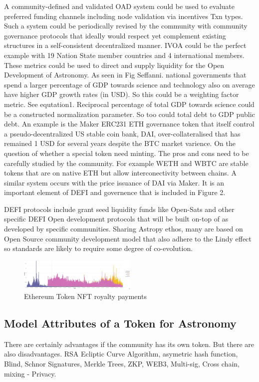 \documentclass[final,5p,times,twocolumn,authoryear]{elsarticle}
\begin{document}
A community-defined and validated OAD system could be used to evaluate preferred funding channels including node validation via incentives Txn types. Such a system could be periodically revised by the community with community governance protocols that ideally would respect yet complement existing structures in a self-consistent decentralized manner. IVOA could be the perfect example with 19 Nation State member countries and 4 international members. These metrics could be used to direct and supply liquidity for the Open Development of Astronomy. As seen in Fig Seffanni. national governments that spend a larger percentage of GDP towards science and technology also on average have higher GDP growth rates (in USD). So this could be a weighting factor metric. See equtation1. Reciprocal percentage of total GDP towards science could be a constructed normalization parameter. So too could total debt to GDP public debt.  An example is the Maker ERC231 ETH governance token that itself control a  pseudo-decentralized US stable coin bank, DAI, over-collateralised that has remained 1 USD for several years despite the BTC market varience.  On the question of whether a special token need minting. The pros and cons need to be carefully studied by the community. For example WETH and WBTC are stable tokens that are on native ETH but allow interconectivity between chains. A similar system occurs with the price issuance of DAI via Maker. It is an important element of DEFI and governence that is included in Figure 2.   

DEFI protocols include grant seed liquidity funds like Open-Sats and other specific DEFI Open development protocols that will be built on-top of as developed by specific communities. Sharing Astropy ethos, many are based on Open Source community development model that also adhere to the Lindy effect so standards are likely to require some degree of co-evolution.


 \begin{figure}
    \centering
    \includegraphics[width=0.5\textwidth]{figs/royalty_pay.jpg}
    \caption{Ethereum Token NFT royalty payments}
\end{figure}
\subsection{Model Attributes of a Token for Astronomy}
\label{subsec:btc4}
There are certainly advantages if the community has its own token. But there are also disadvantages. RSA Ecliptic Curve Algorithm, asymetric hash function, Blind, Schnor Signatures, Merkle Trees, ZKP,  WEB3, Multi-sig, Cross chain, mixing - Privacy. 
\end{document}
